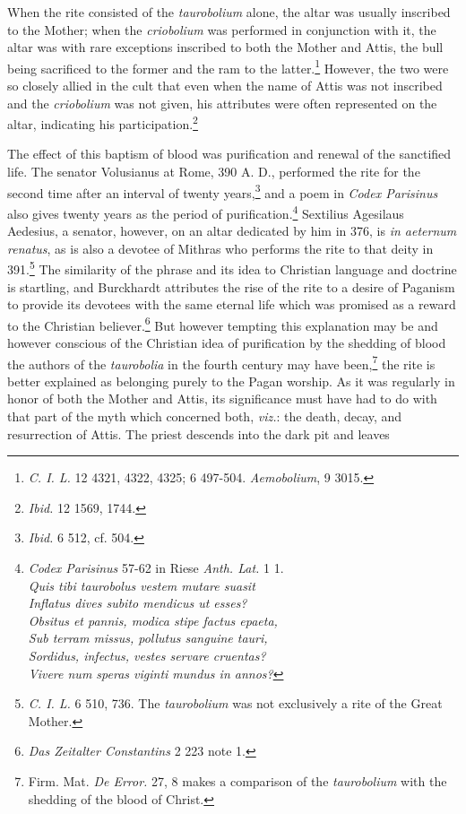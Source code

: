 \documentclass[a4paper, 11pt, oneside, polutonikogreek, english]{article}
\begin{document}
When the rite consisted of the \emph{taurobolium} alone, the altar was usually inscribed to the Mother; when the \emph{criobolium} was performed in conjunction with it, the altar was with rare exceptions inscribed to both the Mother and Attis, the bull being sacrificed to the former and the ram to the latter.\footnote{\emph{C. I. L.} 12 4321, 4322, 4325; 6 497-504. \emph{Aemobolium}, 9 3015.} However, the two were so closely allied in the cult that even when the name of Attis was not inscribed and the \emph{criobolium} was not given, his attributes were often represented on the altar, indicating his participation.\footnote{\emph{Ibid.} 12 1569, 1744.}

The effect of this baptism of blood was purification and renewal of the sanctified life. The senator Volusianus at Rome, 390 A. D., performed the rite for the second time after an interval of twenty years,\footnote{\emph{Ibid.} 6 512, cf. 504.} and a poem in \emph{Codex Parisinus} also gives twenty years as the period of purification.\footnote{\emph{Codex Parisinus} 57-62 in Riese \emph{Anth. Lat.} 1 1.\\\hspace*{10mm}\emph{Quis tibi taurobolus vestem mutare suasit}\\\hspace*{10mm}\emph{Inflatus dives subito mendicus ut esses?}\\\hspace*{10mm}\emph{Obsitus et pannis, modica stipe factus epaeta,}\\\hspace*{10mm}\emph{Sub terram missus, pollutus sanguine tauri,}\\\hspace*{10mm}\emph{Sordidus, infectus, vestes servare cruentas?}\\\hspace*{10mm}\emph{Vivere num speras viginti mundus in annos?}} Sextilius Agesilaus Aedesius, a senator, however, on an altar dedicated by him in 376, is \emph{in aeternum renatus}, as is also a devotee of Mithras who performs the rite to that deity in 391.\footnote{\emph{C. I. L.} 6 510, 736. The \emph{taurobolium} was not exclusively a rite of the Great Mother.} The similarity of the phrase and its idea to Christian language and doctrine is startling, and Burckhardt attributes the rise of the rite to a desire of Paganism to provide its devotees with the same eternal life which was promised as a reward to the Christian believer.\footnote{\emph{Das Zeitalter Constantins} 2 223 note 1.} But however tempting this explanation may be and however conscious of the Christian idea of purification by the shedding of blood the authors of the \emph{taurobolia} in the fourth century may have been,\footnote{Firm. Mat. \emph{De Error.} 27, 8 makes a comparison of the \emph{taurobolium} with the shedding of the blood of Christ.} the rite is better explained as belonging purely to the Pagan worship. As it was regularly in honor of both the Mother and Attis, its significance must have had to do with that part of the myth which concerned both, \emph{viz.}: the death, decay, and resurrection of Attis. The priest descends into the dark pit and leaves 
\end{document}
